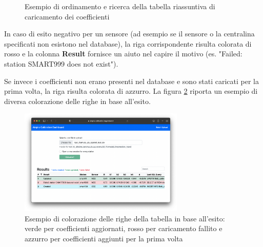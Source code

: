 \begin{figure}[H]%
    \centering
    \captionsetup{justification=centering}
    \caption{Esempio di ordinamento e ricerca della tabella riassuntiva di caricamento dei coefficienti}%
    \label{fig:interfaccia-4-5}%
\end{figure}

In caso di esito negativo per un sensore (ad esempio se il sensore o la centralina specificati non esistono nel database), la riga corrispondente risulta colorata di rosso e la colonna \textbf{Result} fornisce un aiuto nel capire il motivo (es. "Failed: station SMART999 does not exist").

Se invece i coefficienti non erano presenti nel database e sono stati caricati per la prima volta, la riga risulta colorata di azzurro. La figura \ref{fig:interfaccia-7} riporta un esempio di diversa colorazione delle righe in base all'esito.

\begin{figure}[H]
\centering
\includegraphics[width=0.70\textwidth,height=\textheight,keepaspectratio]{img/interfaccia_7}
\caption{Esempio di colorazione delle righe della tabella in base all'esito: verde per coefficienti aggiornati, rosso per caricamento fallito e azzurro per coefficienti aggiunti per la prima volta}
\label{fig:interfaccia-7}
\end{figure}

